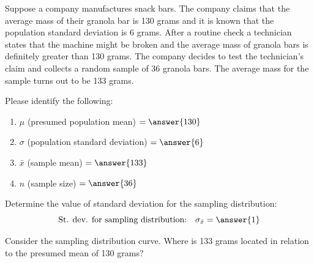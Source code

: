 \documentclass{ximera}
\begin{document}
\begin{problem}\label{pr:bars}
Suppose a company manufactures snack bars. The company claims that the average mass of their granola bar is 130 grams and it is known that the population standard deviation is 6 grams. After a routine check a technician states that the machine might be broken and the average mass of granola bars is definitely greater than 130 grams. The company decides to test the technician's claim and collects a random sample of 36 granola bars. The average mass for the sample turns out to be 133 grams.

\begin{question}
Please identify the following:
 \begin{enumerate}
     \item $\mu$ (presumed population mean) $= \answer{130}$
     \item $\sigma$ (population standard deviation) $= \answer{6}$
     \item $\bar{x}$ (sample mean) $=\answer{133}$
     \item $n$ (sample size) $= \answer{36}$
\end{enumerate}
\end{question}

\begin{question}
Determine the value of standard deviation for the sampling distribution:
$$\mbox{St. dev. for sampling distribution:}\quad\sigma_{\bar{x}}= \answer{1}$$
\end{question}

\begin{question}
    Consider the sampling distribution curve.  Where is 133 grams located in relation to the presumed mean of 130 grams?
    \begin{multipleChoice}
 \end{multipleChoice}
\end{question}




\end{problem}
\end{document}
